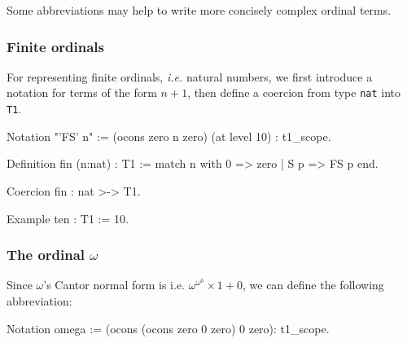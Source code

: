\documentclass[a4paper]{book}
\begin{document}
Some abbreviations may help to write more concisely complex ordinal terms.

\subsubsection{Finite ordinals}
\label{sec:orgheadline67}

For representing finite ordinals, \emph{i.e.} natural numbers, we first introduce a notation for terms of the form $n+1$, then define a coercion from type \texttt{nat} into \texttt{T1}.
\label{sect:notation-FS}

\begin{Coqsrc}
Notation "'FS' n" :=
     (ocons zero n zero) (at level 10) : t1_scope.
\end{Coqsrc}

\label{sect:notation-F}

\begin{Coqsrc}
Definition fin (n:nat) : T1 := 
    match n with 0 => zero | S p => FS p end. 

Coercion fin  : nat >-> T1.

Example ten : T1 := 10.   
\end{Coqsrc}



\subsubsection{The ordinal \(\omega\)}
\label{sec:orgheadline68}

  Since \(\omega\)'s Cantor normal form is
i.e. \(\omega^{\omega^0}\times 1+ 0\), we can define the following abbreviation:

\label{sect:omega-notation2}
\begin{Coqsrc}
Notation omega := (ocons (ocons zero 0 zero) 0 zero): t1_scope.
\end{Coqsrc}
\end{document}
